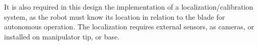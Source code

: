 

It is also required in this design the implementation of a
localization/calibration system, as the robot must know its location in
relation to the blade for autonomous operation. The localization requires
external sensors, as cameras, or installed on manipulator tip, or base.




